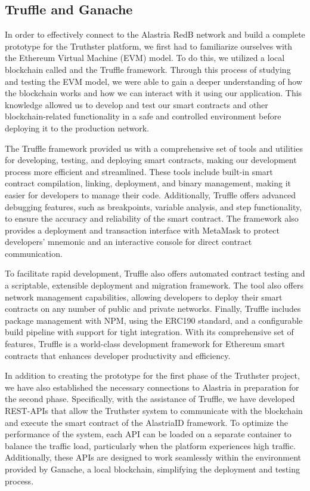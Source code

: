 \documentclass[target=mst,aauheader=]{thud}
\begin{document}
\subsection{Truffle and Ganache}

In order to effectively connect to the Alastria RedB network and build a complete prototype for the Truthster platform, we first had to familiarize ourselves with the Ethereum Virtual Machine (EVM) model. To do this, we utilized a local blockchain called  and the Truffle \cite{truffle} framework. Through this process of studying and testing the EVM model, we were able to gain a deeper understanding of how the blockchain works and how we can interact with it using our application. This knowledge allowed us to develop and test our smart contracts and other blockchain-related functionality in a safe and controlled environment before deploying it to the production network.

The Truffle framework provided us with a comprehensive set of tools and utilities for developing, testing, and deploying smart contracts, making our development process more efficient and streamlined. These tools include built-in smart contract compilation, linking, deployment, and binary management, making it easier for developers to manage their code. Additionally, Truffle offers advanced debugging features, such as breakpoints, variable analysis, and step functionality, to ensure the accuracy and reliability of the smart contract. The framework also provides a deployment and transaction interface with MetaMask to protect developers' mnemonic and an interactive console for direct contract communication.

To facilitate rapid development, Truffle also offers automated contract testing and a scriptable, extensible deployment and migration framework. The tool also offers network management capabilities, allowing developers to deploy their smart contracts on any number of public and private networks. Finally, Truffle includes package management with NPM, using the ERC190 standard, and a configurable build pipeline with support for tight integration. With its comprehensive set of features, Truffle is a world-class development framework for Ethereum smart contracts that enhances developer productivity and efficiency.


In addition to creating the prototype for the first phase of the Truthster project, we have also established the necessary connections to Alastria in preparation for the second phase. Specifically, with the assistance of Truffle, we have developed REST-APIs that allow the Truthster system to communicate with the blockchain and execute the smart contract of the AlastriaID framework.
To optimize the performance of the system, each API can be loaded on a separate container to balance the traffic load, particularly when the platform experiences high traffic. Additionally, these APIs are designed to work seamlessly within the environment provided by Ganache, a local blockchain, simplifying the deployment and testing process.
\end{document}
